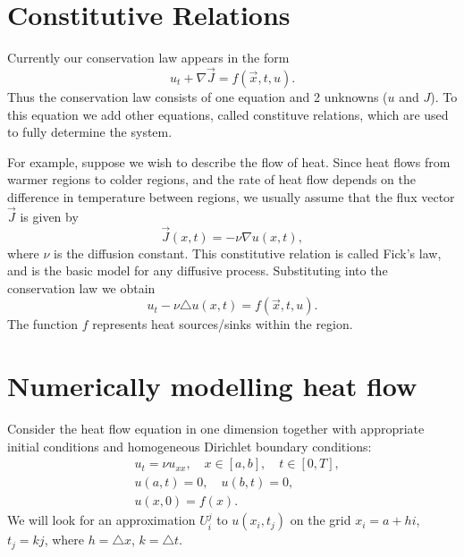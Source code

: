 \section{Constitutive Relations}
Currently our conservation law appears in the form 
\[u_t + \nabla \vec{J} = f(\vec{x},t,u).\]
Thus the conservation law consists of one equation and 2 unknowns ($u$ and $J$).
To this equation we add other equations, called constituve relations, which are used to fully determine the system. 

For example, suppose we wish to describe the flow of heat. Since heat flows from warmer regions to colder regions, and the rate of heat flow depends on the difference in temperature between regions, we usually assume that the flux vector $\vec{J}$ is given by 
\[
\vec{J}(x,t) = -\nu \nabla u(x,t),
\]
where $\nu$ is the diffusion constant.
This constitutive relation is called Fick's law, and is the basic model for any diffusive process. Substituting into the conservation law we obtain 
\[u_t -\nu \triangle u(x,t) = f(\vec{x},t,u).\]  
The function $f$ represents heat sources/sinks within the region. 

\section{Numerically modelling heat flow}
Consider the heat flow equation in one dimension together with appropriate initial conditions and homogeneous Dirichlet boundary conditions: 
\begin{align*}
	&{ } u_t = \nu u_{xx}, \quad x \in [a,b],\quad t \in [0,T], \\
	&{ } u(a,t) = 0,\quad u(b,t) = 0,\\
	&{ } u(x,0) = f(x).
\end{align*}
We will look for an approximation $U^j_i$ to $u(x_i,t_j)$ on the grid $x_i = a +  hi$, $t_j = kj$, where $h = \triangle x$, $k = \triangle t$.

